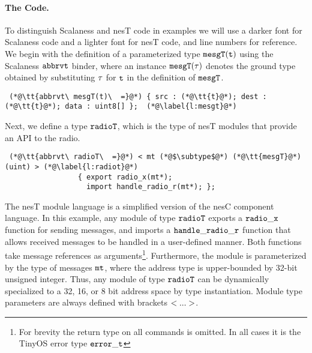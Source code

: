 \paragraph{The Code.} To distinguish Scalaness and nesT code in examples we will use a darker
font for Scalaness code and a lighter font for nesT code, and line numbers for reference. We
begin with the definition of a parameterized type $\tt{mesgT(t)}$ using the Scalaness
$\tt{abbrvt}$ binder, where an instance $\tt{mesgT}(\t)$ denotes the ground type obtained by
substituting $\t$ for $\tt{t}$ in the definition of $\tt{mesgT}$.

\lstset{numbers=left,
  numberstyle=\tiny, firstnumber=1, stepnumber=1, numbersep=0pt,
  basicstyle=\ttfamily}  {\scriptsize
\begin{lstlisting}
 (*@\tt{abbrvt\ mesgT(t)\  =}@*) { src : (*@\tt{t}@*); dest : (*@\tt{t}@*); data : uint8[] };  (*@\label{l:mesgt}@*)
\end{lstlisting}
}
\noindent Next, we define a type $\tt{radioT}$,
which is the type of nesT modules that provide an API to the radio. 
\lstset{numbers=left, numberstyle=\tiny, firstnumber=2, stepnumber=1,
  numbersep=0pt, basicstyle=\ttfamily}
{\scriptsize
\begin{lstlisting}
 (*@\tt{abbrvt\ radioT\  =}@*) < mt (*@$\subtype$@*) (*@\tt{mesgT}@*)(uint) > (*@\label{l:radiot}@*)
                 { export radio_x(mt*); 
                   import handle_radio_r(mt*); };
\end{lstlisting}
}
\noindent The nesT module language is a simplified version of the nesC component language. In
this example, any module of type $\tt{radioT}$ exports a $\tt{radio\_x}$ function for sending
messages, and imports a $\tt{handle\_radio\_r}$ function that allows received messages to be
handled in a user-defined manner. Both functions take message references as
arguments\footnote{For brevity the return type on all commands is omitted. In all cases it is
  the TinyOS error type $\tt{error\_t}$ }. Furthermore, the module is parameterized by the type
of messages $\tt{mt}$, where the address type is upper-bounded by 32-bit unsigned integer. Thus,
any module of type $\tt{radioT}$ can be dynamically specialized to a 32, 16, or 8 bit address
space by type instantiation. Module type parameters are always defined with brackets
$\tt{<...>}$.
 
